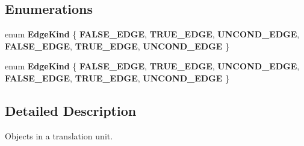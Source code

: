 \subsection*{Enumerations}
\begin{DoxyCompactItemize}
\item 
\mbox{\label{namespacespan_1_1ir_1_1object_aa99af8553653a91247f327808d239765}} 
enum {\bfseries Edge\+Kind} \{ \newline
{\bfseries F\+A\+L\+S\+E\+\_\+\+E\+D\+GE}, 
{\bfseries T\+R\+U\+E\+\_\+\+E\+D\+GE}, 
{\bfseries U\+N\+C\+O\+N\+D\+\_\+\+E\+D\+GE}, 
{\bfseries F\+A\+L\+S\+E\+\_\+\+E\+D\+GE}, 
\newline
{\bfseries T\+R\+U\+E\+\_\+\+E\+D\+GE}, 
{\bfseries U\+N\+C\+O\+N\+D\+\_\+\+E\+D\+GE}
 \}
\item 
\mbox{\label{namespacespan_1_1ir_1_1object_aa99af8553653a91247f327808d239765}} 
enum {\bfseries Edge\+Kind} \{ \newline
{\bfseries F\+A\+L\+S\+E\+\_\+\+E\+D\+GE}, 
{\bfseries T\+R\+U\+E\+\_\+\+E\+D\+GE}, 
{\bfseries U\+N\+C\+O\+N\+D\+\_\+\+E\+D\+GE}, 
{\bfseries F\+A\+L\+S\+E\+\_\+\+E\+D\+GE}, 
\newline
{\bfseries T\+R\+U\+E\+\_\+\+E\+D\+GE}, 
{\bfseries U\+N\+C\+O\+N\+D\+\_\+\+E\+D\+GE}
 \}
\end{DoxyCompactItemize}


\subsection{Detailed Description}
Objects in a translation unit. 